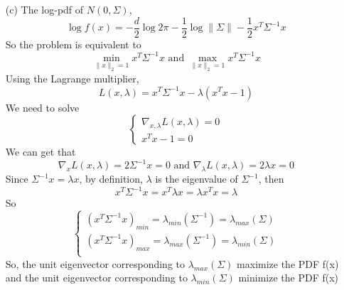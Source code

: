 \documentclass[a4paper,12pt]{article}
\begin{document}
\begin{itemize}
\clearpage
\item[(c)]
The log-pdf of $N(0,\Sigma)$,
$$
\log f(x) = -\frac{d}{2} \log 2 \pi - \frac{1}{2} \log \| \Sigma \| - \frac{1}{2} x^T \Sigma^{-1} x
$$
So the problem is equivalent to 
$$
\min \limits_{\| x \|_2 = 1} x^T \Sigma^{-1} x \text{  and  } \max \limits_{\| x \|_2 = 1} x^T \Sigma^{-1} x
$$
Using the Lagrange multiplier,
$$
L(x,\lambda) = x^T \Sigma^{-1} x - \lambda(x^T x -1)
$$
We need to solve
$$
\begin{cases}
\nabla_{x,\lambda} L(x,\lambda) = 0 \\
x^T x - 1 = 0
\end{cases}
$$
We can get that 
$$
\nabla_{x} L(x,\lambda) = 2 \Sigma^{-1} x = 0 \text{  and  } \nabla_{\lambda} L(x,\lambda) = 2 \lambda x =0
$$
Since $\Sigma^{-1} x = \lambda x  $, by definition, $\lambda$ is the eigenvalue of $\Sigma^{-1}$, then
$$
x^T \Sigma^{-1} x = x^T  \lambda x =  \lambda x^T x = \lambda
$$
So
$$
\begin{cases}
(x^T \Sigma^{-1} x)_{min} = \lambda_{min}(\Sigma^{-1}) = \lambda_{max}(\Sigma) \\
(x^T \Sigma^{-1} x)_{max} = \lambda_{max}(\Sigma^{-1}) = \lambda_{min}(\Sigma) \\
\end{cases}
$$
So, the unit eigenvector corresponding to $ \lambda_{max}(\Sigma)$ maximize the PDF f(x) and the unit eigenvector corresponding to $ \lambda_{min}(\Sigma)$ minimize the PDF f(x)
\end{itemize}

\clearpage
\end{document}
